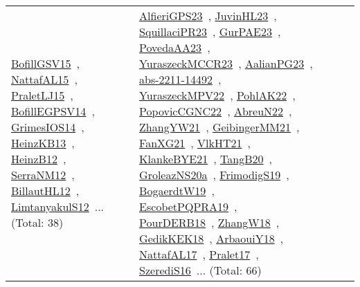 {\begin{longtable}{lp{3cm}>{\raggedright\arraybackslash}p{6cm}>{\raggedright\arraybackslash}p{6cm}>{\raggedright\arraybackslash}p{8cm}}
\href{papers/BofillGSV15.pdf}{BofillGSV15}~\cite{BofillGSV15}, \href{articles/NattafAL15.pdf}{NattafAL15}~\cite{NattafAL15}, \href{papers/PraletLJ15.pdf}{PraletLJ15}~\cite{PraletLJ15}, \href{papers/BofillEGPSV14.pdf}{BofillEGPSV14}~\cite{BofillEGPSV14}, \href{articles/GrimesIOS14.pdf}{GrimesIOS14}~\cite{GrimesIOS14}, \href{papers/HeinzKB13.pdf}{HeinzKB13}~\cite{HeinzKB13}, \href{papers/HeinzB12.pdf}{HeinzB12}~\cite{HeinzB12}, \href{papers/SerraNM12.pdf}{SerraNM12}~\cite{SerraNM12}, \href{papers/BillautHL12.pdf}{BillautHL12}~\cite{BillautHL12}, \href{articles/LimtanyakulS12.pdf}{LimtanyakulS12}~\cite{LimtanyakulS12}... (Total: 38) & \href{articles/AlfieriGPS23.pdf}{AlfieriGPS23}~\cite{AlfieriGPS23}, \href{papers/JuvinHL23.pdf}{JuvinHL23}~\cite{JuvinHL23}, \href{papers/SquillaciPR23.pdf}{SquillaciPR23}~\cite{SquillaciPR23}, \href{articles/GurPAE23.pdf}{GurPAE23}~\cite{GurPAE23}, \href{papers/PovedaAA23.pdf}{PovedaAA23}~\cite{PovedaAA23}, \href{articles/YuraszeckMCCR23.pdf}{YuraszeckMCCR23}~\cite{YuraszeckMCCR23}, \href{papers/AalianPG23.pdf}{AalianPG23}~\cite{AalianPG23}, \href{articles/abs-2211-14492.pdf}{abs-2211-14492}~\cite{abs-2211-14492}, \href{articles/YuraszeckMPV22.pdf}{YuraszeckMPV22}~\cite{YuraszeckMPV22}, \href{articles/PohlAK22.pdf}{PohlAK22}~\cite{PohlAK22}, \href{papers/PopovicCGNC22.pdf}{PopovicCGNC22}~\cite{PopovicCGNC22}, \href{articles/AbreuN22.pdf}{AbreuN22}~\cite{AbreuN22}, \href{articles/ZhangYW21.pdf}{ZhangYW21}~\cite{ZhangYW21}, \href{papers/GeibingerMM21.pdf}{GeibingerMM21}~\cite{GeibingerMM21}, \href{articles/FanXG21.pdf}{FanXG21}~\cite{FanXG21}, \href{articles/VlkHT21.pdf}{VlkHT21}~\cite{VlkHT21}, \href{papers/KlankeBYE21.pdf}{KlankeBYE21}~\cite{KlankeBYE21}, \href{papers/TangB20.pdf}{TangB20}~\cite{TangB20}, \href{papers/GroleazNS20a.pdf}{GroleazNS20a}~\cite{GroleazNS20a}, \href{papers/FrimodigS19.pdf}{FrimodigS19}~\cite{FrimodigS19}, \href{papers/BogaerdtW19.pdf}{BogaerdtW19}~\cite{BogaerdtW19}, \href{articles/EscobetPQPRA19.pdf}{EscobetPQPRA19}~\cite{EscobetPQPRA19}, \href{articles/PourDERB18.pdf}{PourDERB18}~\cite{PourDERB18}, \href{articles/ZhangW18.pdf}{ZhangW18}~\cite{ZhangW18}, \href{articles/GedikKEK18.pdf}{GedikKEK18}~\cite{GedikKEK18}, \href{papers/ArbaouiY18.pdf}{ArbaouiY18}~\cite{ArbaouiY18}, \href{articles/NattafAL17.pdf}{NattafAL17}~\cite{NattafAL17}, \href{papers/Pralet17.pdf}{Pralet17}~\cite{Pralet17}, \href{papers/SzerediS16.pdf}{SzerediS16}~\cite{SzerediS16}... (Total: 66)\\

\end{longtable}}
